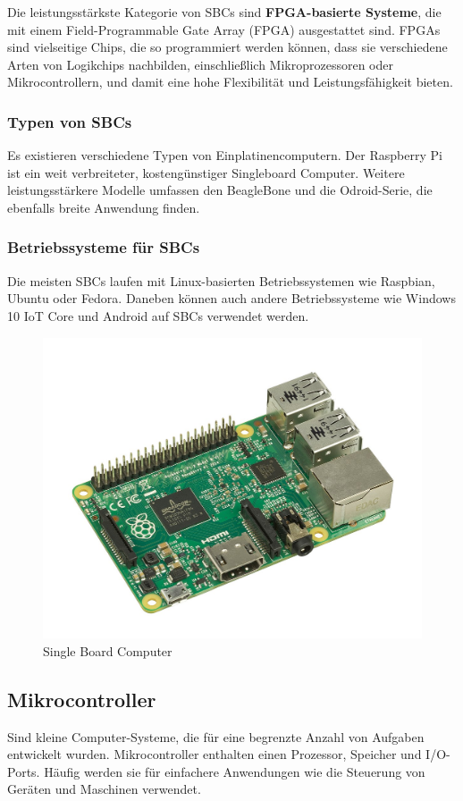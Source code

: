 Die leistungsstärkste Kategorie von SBCs sind \textbf{FPGA-basierte Systeme}, die mit einem Field-Programmable Gate Array (FPGA) ausgestattet sind. FPGAs sind vielseitige Chips, die so programmiert werden können, dass sie verschiedene Arten von Logikchips nachbilden, einschließlich Mikroprozessoren oder Mikrocontrollern, und damit eine hohe Flexibilität und Leistungsfähigkeit bieten.

\subsubsection{Typen von SBCs}
Es existieren verschiedene Typen von Einplatinencomputern. Der Raspberry Pi ist ein weit verbreiteter, kostengünstiger Singleboard Computer. Weitere leistungsstärkere Modelle umfassen den BeagleBone und die Odroid-Serie, die ebenfalls breite Anwendung finden.

\subsubsection{Betriebssysteme für SBCs}
Die meisten SBCs laufen mit Linux-basierten Betriebssystemen wie Raspbian, Ubuntu oder Fedora. Daneben können auch andere Betriebssysteme wie Windows 10 IoT Core und Android auf SBCs verwendet werden. \parencite{EinplatinencomputerSBCs}

\begin{figure}[H]
	\centering
	\includegraphics[width=0.7\linewidth]{images/SingleBoard Computer.jpg}
	\caption[Single Board Computer]{Single Board Computer}
	\label{fig:Single Board Computer}
\end{figure}

\newpage
\subsection{Mikrocontroller}
Sind kleine Computer-Systeme, die für eine begrenzte Anzahl von Aufgaben entwickelt wurden. Mikrocontroller enthalten einen Prozessor, Speicher und I/O-Ports. Häufig werden sie für einfachere Anwendungen wie die Steuerung von Geräten und Maschinen verwendet. \parencite{EinzelplatinencomputerVsMikrocontroller}

